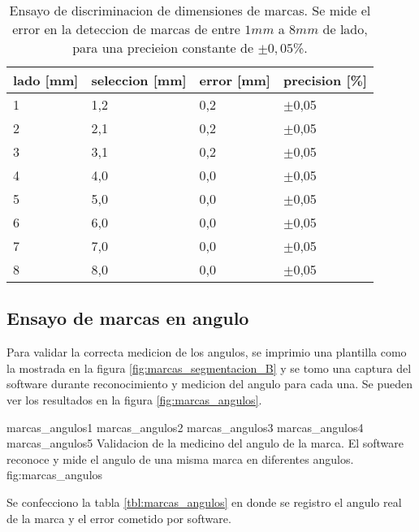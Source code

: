       \begin{table}[!ht]
         \centering
         \caption[Ensayos de discriminacion de dimensiones de marcas]{Ensayo de discriminacion de dimensiones de marcas. Se mide el error en la deteccion de marcas de entre $1mm$ a $8mm$ de lado, para una precieion constante de $\pm0,05$\%.}
         \begin{tabular}[!ht]{m{1.6cm}m{1.6cm}m{1.6cm}m{1.6cm}}
            \toprule
            \textbf{lado [mm]} & \textbf{seleccion [mm]} & \textbf{error [mm]}& \textbf{precision [\%]}\\
            \midrule
            {1}& {1,2}& {0,2}& {$\pm$0,05}\\
            {2}& {2,1}& {0,2}& {$\pm$0,05}\\
            {3}& {3,1}& {0,2}& {$\pm$0,05}\\
            {4}& {4,0}& {0,0}& {$\pm$0,05}\\
            {5}& {5,0}& {0,0}& {$\pm$0,05}\\
            {6}& {6,0}& {0,0}& {$\pm$0,05}\\
            {7}& {7,0}& {0,0}& {$\pm$0,05}\\
            {8}& {8,0}& {0,0}& {$\pm$0,05}\\
            \bottomrule
         \end{tabular}
         \label{tbl:marcas_dimensiones}
      \end{table}

\subsection{Ensayo de marcas en angulo}

Para validar la correcta medicion de los angulos, se imprimio una plantilla como la mostrada en la figura \ref{fig:marcas_segmentacion_B} y se tomo una captura del software durante reconocimiento y medicion del angulo para cada una. Se pueden ver los resultados en la figura \ref{fig:marcas_angulos}.\par

\subfigthreetwo
   {marcas_angulos1}
   {marcas_angulos2}
   {marcas_angulos3}
   {marcas_angulos4}
   {marcas_angulos5}
   {Validacion de la medicino del angulo de la marca. El software reconoce y mide el angulo de una misma marca en diferentes angulos.}
   {fig:marcas_angulos}

   Se confecciono la tabla \ref{tbl:marcas_angulos} en donde se registro el angulo real de la marca y el error cometido por software.\par


